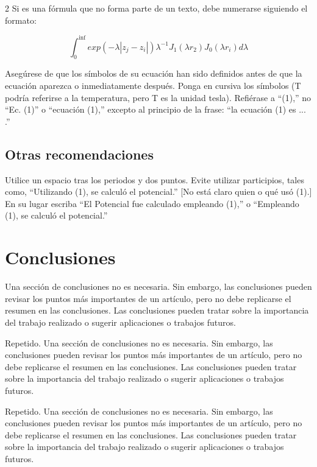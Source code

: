 \documentclass[5p,times,authoryear]{sciarticle}
\begin{document}
\begin{multicols}{2}
Si es una fórmula que no forma parte de un texto, debe numerarse siguiendo el formato:

\begin{equation} \label{e2}
\int_0^{\inf} exp(-\lambda |z_j - z_i |) \lambda^{-1} J_1 (\lambda  r_2 ) J_0 (\lambda r_i ) d\lambda
\end{equation}

Asegúrese de que los símbolos de su ecuación han sido definidos
antes de que la ecuación aparezca o inmediatamente después. Ponga en
cursiva los símbolos (T podría referirse a la temperatura, pero T es
la unidad tesla). Refiérase a ``(1),'' no ``Ec. (1)'' o ``ecuación
(1),'' excepto al principio de la frase: ``la ecuación (1) es ...
.''

\subsection{Otras recomendaciones}

Utilice un espacio tras los periodos y dos puntos. Evite utilizar
participios, tales como, ``Utilizando (1), se calculó el
potencial.'' [No está claro quien o qué usó (1).] En su lugar
escriba ``El Potencial fue calculado empleando (1),'' o ``Empleando
(1), se calculó el potencial.''

\section{Conclusiones}

Una sección de conclusiones no es necesaria. Sin embargo, las conclusiones pueden revisar los puntos más importantes de un artículo, pero no debe replicarse el resumen en las conclusiones. Las conclusiones pueden tratar sobre la importancia del trabajo realizado o sugerir aplicaciones o trabajos futuros.

Repetido. Una sección de conclusiones no es necesaria. Sin embargo, las conclusiones pueden revisar los puntos más importantes de un artículo, pero no debe replicarse el resumen en las conclusiones. Las conclusiones pueden tratar sobre la importancia del trabajo realizado o sugerir aplicaciones o trabajos futuros.

Repetido. Una sección de conclusiones no es necesaria. Sin embargo, las conclusiones pueden revisar los puntos más importantes de un artículo, pero no debe replicarse el resumen en las conclusiones. Las conclusiones pueden tratar sobre la importancia del trabajo realizado o sugerir aplicaciones o trabajos futuros.


\end{multicols}
\end{document}
